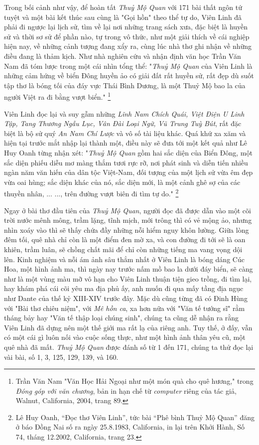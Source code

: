 \documentclass[../main.tex]{subfiles}
\begin{document}
\begin{multicols}{2}
Trong bối cảnh như vậy, để hoàn tất \textit{Thuỷ Mộ Quan} với 171 bài thất ngôn tứ tuyệt và một bài kết thúc sau cùng là "Gọi hồn" theo thể tự do, Viên Linh đã phải đi ngược lại lịch sử, tìm về lại nơi những trang sách xưa, đặc biệt là huyền sử và thời sơ sử để phần nào, tự trong vô thức, như một giải thích về cái nghiệp hiện nay, về những cảnh tượng đang xẩy ra, cùng lúc nhà thơ ghi nhận về những điều đang là thảm kịch. Như nhà nghiên cứu và nhận định văn học Trần Văn Nam đã tóm lược trong một cái nhìn tổng thể: "\textit{Thuỷ Mộ Quan} của Viên Linh là những cảm hứng về biển Đông huyền ảo có giải đất rất huyền sử, rất đẹp dù suốt tập thơ là bóng tối của đáy vực Thái Bình Dương, là một Thuỷ Mộ bao la của người Việt ra đi bằng vượt biển." \footnote{
Trần Văn Nam "Văn Học Hải Ngoại như một món quà cho quê hương," trong \textit{Đóng góp với văn chương}, bản in hạn chế từ \textit{computer} riêng của tác giả, Walnut, California, 2004, trang 89.} 

Viên Linh đọc lại và suy gẫm những \textit{Lĩnh Nam Chích Quái, Việt Điện U Linh Tập, Tang Thương Ngẫu Lục, Vân Đài Loại Ngữ, Vũ Trung Tuỳ Bút}, rất đặc biệt là bộ sử quý \textit{An Nam Chí Lược} và vô số tài liệu khác. Quá khứ xa xăm và hiện tại trước mắt nhập lại thành một, điều này sẽ đưa tới một kết quả như Lê Huy Oanh từng nhận xét: "\textit{Thuỷ Mộ Quan} gồm hai sắc diện của Biển Đông, một sắc diện phiếu diễu mơ màng thắm tươi rực rỡ, nơi phát sinh và diễn tiến nhiều ngàn năm văn hiến của dân tộc Việt-Nam, đối tượng của một lịch sử vừa êm đẹp vừa oai hùng; sắc diện khác của nó, sắc diện mới, là một cảnh ghê sợ của các thuyền nhân, ... ..., trên đường vượt biên đi tìm tự do." \footnote{
Lê Huy Oanh, “Đọc thơ Viên Linh”, tức bài “Phê bình Thuỷ Mộ Quan” đăng ở báo Đồng Nai số ra ngày 25.8.1983, California, in lại trên Khởi Hành, Số 74, tháng 12.2002, California, trang 23.} 

Ngay ở bài thơ đầu tiên của \textit{Thuỷ Mộ Quan}, người đọc đã được dẫn vào một cõi trời nước mênh mông, trầm lặng, tĩnh mịch, mới trông thì có vẻ mộng ảo, nhưng nhìn xoáy vào thì sẽ thấy chứa đầy những nỗi hiểm nguy khôn lường. Giữa lòng đêm tối, quê nhà chỉ còn là một điểm đen mờ xa, và con đường đi tới sẽ là oan khiên, trầm luân, sẽ chồng chất mãi để chỉ còn những tiếng ma vang vọng dội lên. Kinh nghiệm và nỗi ám ảnh sâu thẳm nhất ở Viên Linh là bóng dáng Cúc Hoa, một hình ảnh ma, thì ngày nay trước nấm mồ bao la dưới đáy biển, sẽ càng như là một vùng màu mỡ vô hạn cho Viên Linh thuận tiện gieo trồng, đi tìm lại, hay khám phá cái cõi yêu ma địa phủ ấy, anh muốn đi qua mấy tầng địa ngục như Dante của thế kỷ XIII-XIV trước đây. Mặc dù cũng từng đã có Đinh Hùng với "Bài thơ chiêu niệm", với \textit{Mê hồn ca}, xa hơn nữa với "Văn tế tướng sĩ" rằm tháng bảy hay "Văn tế thập loại chúng sinh", chúng ta cũng dễ nhận ra rằng Viên Linh đã dựng nên một thế giới ma rất lạ của riêng anh. Tuy thế, ở đấy, vẫn có một cái gì luôn nối vào cuộc sống thực, như một hình ảnh thân yêu cũ, một quê nhà đã mất. \textit{Thuỷ Mộ Quan} được đánh số từ 1 đến 171, chúng ta thử đọc lại vài bài, số 1, 3, 125, 129, 139, và 160. 


\end{multicols}
\end{document}
